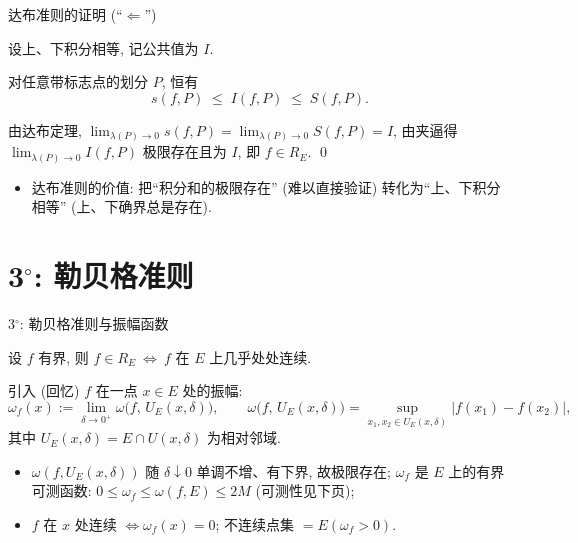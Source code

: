 
\begin{frame}{达布准则的证明 (``$\Leftarrow$'')}

设上、下积分相等, 记公共值为 $I$.

对任意带标志点的划分 $P$, 恒有
\[
s(f, P) \;\leqslant\; I(f, P) \;\leqslant\; S(f, P) .
\]

\pause

由达布定理,
$\displaystyle \lim_{\lambda(P) \to 0} s(f, P) = \lim_{\lambda(P) \to 0} S(f, P) = I$,
由夹逼得 $\displaystyle \lim_{\lambda(P) \to 0} I(f, P)$ 极限存在且为 $I$, 即 $f \in R_E$.
\qed

\pause

\begin{itemize}
\item 达布准则的价值: 把``积分和的极限存在'' (难以直接验证)
  转化为``上、下积分相等'' (上、下确界总是存在).
\end{itemize}

\end{frame}


\section[勒贝格准则]{3$^\circ$: 勒贝格准则}


\begin{frame}{3$^\circ$: 勒贝格准则与振幅函数}

\begin{thm}[勒贝格准则]
设 $f$ 有界, 则 $f \in R_E \ \Longleftrightarrow\ f$ 在 $E$ 上\alert{几乎处处连续}.
\end{thm}

引入 (回忆) $f$ 在一点 $x \in E$ 处的\alert{振幅}:
\[
\omega_f(x) := \lim_{\delta \to 0^+} \omega\big( f,\, U_E(x, \delta) \big),
\qquad
\omega\big( f,\, U_E(x, \delta) \big)
= \sup_{x_1, x_2 \in U_E(x, \delta)} |f(x_1) - f(x_2)| ,
\]
其中 $U_E(x, \delta) = E \cap U(x, \delta)$ 为相对邻域.

\pause

\begin{itemize}
\item $\omega(f, U_E(x, \delta))$ 随 $\delta \downarrow 0$ 单调不增、有下界, 故极限存在;
  $\omega_f$ 是 $E$ 上的\alert{有界可测}函数: $0 \leqslant \omega_f \leqslant \omega(f, E) \leqslant 2M$
  (可测性见下页);
\item $f$ 在 $x$ 处连续 $\Longleftrightarrow \omega_f(x) = 0$;
  \alert{不连续点集} $= E(\omega_f > 0)$.
\end{itemize}

\end{frame}

